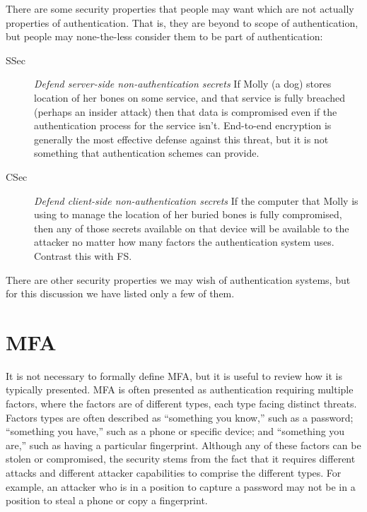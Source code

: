 \documentclass{soups}
\newcommand{\propdescription}[1]{\textit{#1}\newline}
\newcommand{\prop}[1]{\textsf{#1}}
\begin{document}
There are some security properties that people may want which are not actually properties of authentication. That is, they are beyond to scope of authentication, but people may none-the-less consider them to be part of authentication:


\begin{description}
  \item[SSec] \propdescription{Defend server-side non-authentication secrets}
    If Molly (a dog) stores location of her bones on some service,
    and that service is fully breached (perhaps an insider attack)
    then that data is compromised even if the authentication process for the service isn't.
    End-to-end encryption is generally the most effective defense against this threat,
    but it is not something that authentication schemes can provide.

  \item[CSec] \propdescription{Defend client-side non-authentication secrets}
    If the computer that Molly is using to manage the location of her buried bones is fully compromised,
    then any of those secrets available on that device will be available to the attacker no matter how many factors the authentication system uses.
    Contrast this with \prop{FS}.
  
\end{description}

There are other security properties we may wish of authentication systems, but for this discussion we have listed only a few of them.

\section{MFA}

It is not necessary to formally define MFA, but it is useful to review how it is typically presented.
MFA is often presented as authentication requiring multiple factors, where the factors are of different types, each type facing distinct threats.
Factors types are often described as “something you know,” such as a password;
“something you have,” such as a phone or specific device;
and “something you are,” such as having a particular fingerprint.
Although any of these factors can be stolen or compromised,
the security stems from the fact that it requires different attacks and different attacker capabilities to comprise the different types.
For example, an attacker who is in a position to capture a password may not be in a position to steal a phone or copy a fingerprint.
\end{document}
